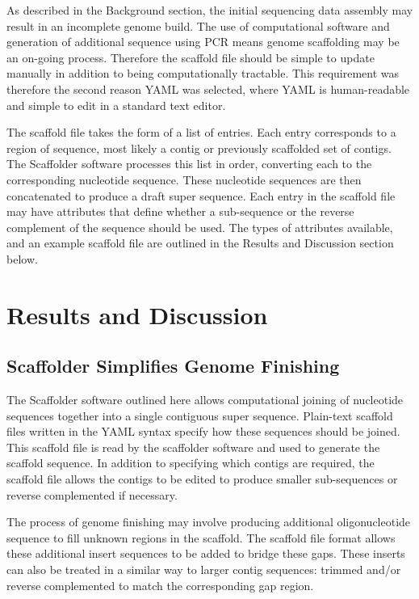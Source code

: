\documentclass[10pt]{bmc_article}
\newenvironment{bmcformat}{\begin{raggedright}\baselineskip20pt\sloppy\setboolean{publ}{false}}{\end{raggedright}\baselineskip20pt\sloppy}
\begin{document}
\begin{bmcformat}
As described in the Background section, the initial sequencing data assembly
may result in an incomplete genome build. The use of computational software and
generation of additional sequence using PCR means genome scaffolding may be an
on-going process. Therefore the scaffold file should be simple to update
manually in addition to being computationally tractable. This requirement was
therefore the second reason YAML was selected, where YAML is human-readable and
simple to edit in a standard text editor. \pb

The scaffold file takes the form of a list of entries. Each entry corresponds
to a region of sequence, most likely a contig or previously scaffolded set of
contigs. The Scaffolder software processes this list in order, converting each
to the corresponding nucleotide sequence. These nucleotide sequences are then
concatenated to produce a draft super sequence. Each entry in the scaffold file
may have attributes that define whether a sub-sequence or the reverse
complement of the sequence should be used. The types of attributes available,
and an example scaffold file are outlined in the Results and Discussion section
below.  \pb

\clearpage

\section*{Results and Discussion} %

\subsection*{Scaffolder Simplifies Genome Finishing} %

The Scaffolder software outlined here allows computational joining of
nucleotide sequences together into a single contiguous super sequence.
Plain-text scaffold files written in the YAML syntax specify how these
sequences should be joined. This scaffold file is read by the scaffolder
software and used to generate the scaffold sequence. In addition to specifying
which contigs are required, the scaffold file allows the contigs to be edited
to produce smaller sub-sequences or reverse complemented if necessary. \pb

The process of genome finishing may involve producing additional
oligonucleotide sequence to fill unknown regions in the scaffold. The scaffold
file format allows these additional insert sequences to be added to bridge
these gaps. These inserts can also be treated in a similar way to larger contig
sequences: trimmed and/or reverse complemented to match the corresponding gap
region. \pb


\end{bmcformat}
\end{document}
